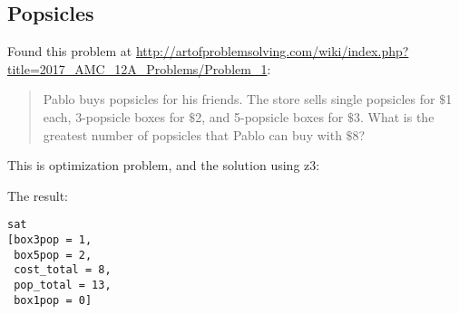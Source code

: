 \subsection{Popsicles}

Found this problem at \url{http://artofproblemsolving.com/wiki/index.php?title=2017_AMC_12A_Problems/Problem_1}:

\begin{framed}
\begin{quotation}

Pablo buys popsicles for his friends. The store sells single popsicles for $\$$1 each, 3-popsicle boxes for $\$$2,
and 5-popsicle boxes for $\$$3. What is the greatest number of popsicles that Pablo can buy with $\$$8?

\end{quotation}
\end{framed}

This is optimization problem, and the solution using z3:



The result:

\begin{lstlisting}
sat
[box3pop = 1,
 box5pop = 2,
 cost_total = 8,
 pop_total = 13,
 box1pop = 0]
\end{lstlisting}


